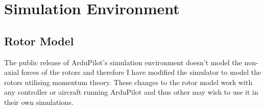 \section{Simulation Environment}
\subsection{Rotor Model}
The public release of ArduPilot's simulation environment doesn't model the non-axial forces of the rotors and therefore I have modified the simulator to model the rotors utilising momentum theory. These changes to the rotor model work with any controller or aircraft running ArduPilot and thus other may wish to use it in their own simulations.

